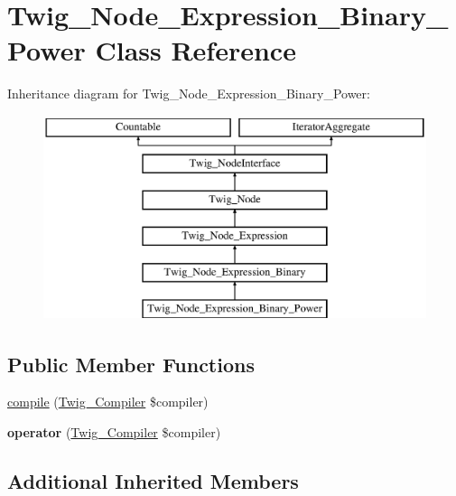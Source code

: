 \hypertarget{classTwig__Node__Expression__Binary__Power}{}\section{Twig\+\_\+\+Node\+\_\+\+Expression\+\_\+\+Binary\+\_\+\+Power Class Reference}
\label{classTwig__Node__Expression__Binary__Power}
Inheritance diagram for Twig\+\_\+\+Node\+\_\+\+Expression\+\_\+\+Binary\+\_\+\+Power\+:\begin{figure}[H]
\begin{center}
\leavevmode
\includegraphics[height=6.000000cm]{classTwig__Node__Expression__Binary__Power}
\end{center}
\end{figure}
\subsection*{Public Member Functions}
\begin{DoxyCompactItemize}
\item 
\hyperlink{classTwig__Node__Expression__Binary__Power_ade146298c606f2d202ab22137ca7a266}{compile} (\hyperlink{classTwig__Compiler}{Twig\+\_\+\+Compiler} \$compiler)
\item 
{\bfseries operator} (\hyperlink{classTwig__Compiler}{Twig\+\_\+\+Compiler} \$compiler)\hypertarget{classTwig__Node__Expression__Binary__Power_a410df4d98840462b5c0fc4713cbf3abf}{}\label{classTwig__Node__Expression__Binary__Power_a410df4d98840462b5c0fc4713cbf3abf}

\end{DoxyCompactItemize}
\subsection*{Additional Inherited Members}


